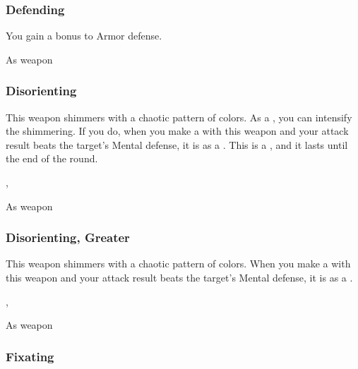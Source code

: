 
\lowercase{\hypertarget{item:Defending}{}}\label{item:Defending}
\hypertarget{item:Defending}{\subsubsection{Defending\hfill{}}}

You gain a  bonus to Armor defense.



 


 As weapon


\lowercase{\hypertarget{item:Disorienting}{}}\label{item:Disorienting}
\hypertarget{item:Disorienting}{\subsubsection{Disorienting\hfill{}}}

This weapon shimmers with a chaotic pattern of colors.
As a , you can intensify the shimmering.
If you do, when you make a   with this weapon and your attack result beats the target's Mental defense, it is \disoriented as a .
This is a , and it lasts until the end of the round.



 , 


 As weapon


\lowercase{\hypertarget{item:Disorienting, Greater}{}}\label{item:Disorienting, Greater}
\hypertarget{item:Disorienting, Greater}{\subsubsection{Disorienting, Greater\hfill{}}}

This weapon shimmers with a chaotic pattern of colors.
When you make a  with this weapon and your attack result beats the target's Mental defense, it is \disoriented as a .



 , 


 As weapon


\lowercase{\hypertarget{item:Fixating}{}}\label{item:Fixating}
\hypertarget{item:Fixating}{\subsubsection{Fixating\hfill{}}}

